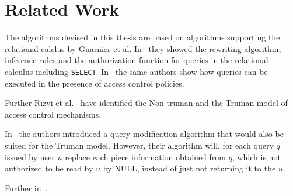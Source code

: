 \section{Related Work}

The algorithms devised in this thesis are based on algorithms supporting the relational calclus by Guarnier et al. In~\cite{guarnieri2016strong} they showed the rewriting algorithm, inference rules and the authorization function for queries in the relational calculus including \texttt{SELECT}.
%
In~\cite{guarnieri2014optimal} the same authors show how queries can be executed in the presence of access control policies.

Further Rizvi et al.~\cite{rizvi2004extending} have identified the Non-truman and the Truman model of access control mechanisms.

In~\cite{wang2007correctness} the authors introduced a query modification algorithm that would also be suited for the Truman model.
%
However, their algorithm will, for each query $q$ issued by user $u$ replace each piece information obtained from $q$, which is not authorized to be read by $u$ by NULL, instead of just not returning it to the $u$.

Further in~\cite{rizvi2004extending}.

